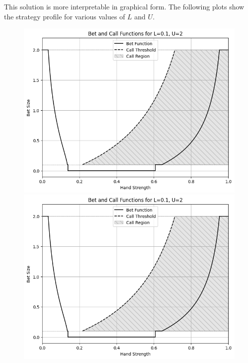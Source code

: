 \documentclass[a4paper,12pt]{article}
\begin{document}
This solution is more interpretable in graphical form. The following plots show the strategy profile for various values of $L$ and $U$.

\begin{figure}[h!]
    \centering
    \begin{minipage}{0.45\textwidth}
        \centering
        \includegraphics[width=\textwidth]{limit_continuous_0.1_2.png}
    \end{minipage}
    \begin{minipage}{0.45\textwidth}
        \centering
        \includegraphics[width=\textwidth]{limit_continuous_0.1_2.png}
    \end{minipage}

\end{figure}
\end{document}

